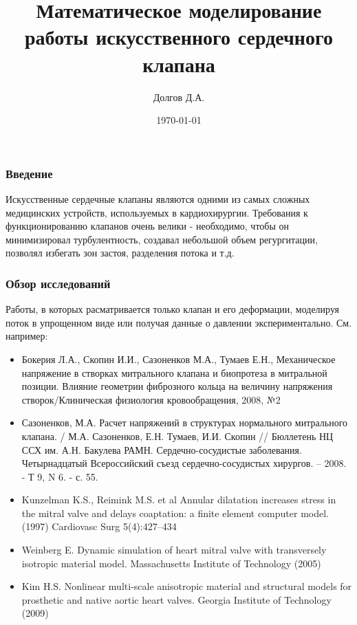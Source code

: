 \documentclass[14pt]{beamer}
\title[Моделирование клапанов]{Математическое моделирование работы искусственного сердечного клапана}
\date{\today}
\author[Долгов Д.А.]{Долгов Д.А.}
\institute{Кемеровский Государственный Университет \\
    \vspace{0.7cm}
    \vspace{0.7cm}
}
\begin{document}
\maketitle

\begin{frame}
\frametitle{Введение}
Искусственные сердечные клапаны являются одними из самых сложных медицинских
устройств, используемых в кардиохирургии. Требования к функционированию
клапанов очень велики - необходимо, чтобы он минимизировал турбулентность,
создавал небольшой объем регургитации, позволял избегать зон застоя, разделения
потока и т.д.
\end{frame}

\begin{frame}
\frametitle{Обзор исследований}
Работы, в которых расматривается только клапан и его деформации, моделируя
поток в упрощенном виде или получая данные о давлении экспериментально. См. например:\\
\par
{\tiny
    \begin{itemize}
        \item[\MVRightarrow] Бокерия Л.А., Скопин И.И., Сазоненков М.А., Тумаев Е.Н., Механическое напряжение в створках митрального клапана и биопротеза в митральной позиции. Влияние геометрии фиброзного кольца на величину напряжения створок/Клиническая физиология кровообращения, 2008, №2
        \item[\MVRightarrow] Сазоненков, М.А. Расчет напряжений в структурах нормального митрального клапана. / М.А. Сазоненков, Е.Н. Тумаев, И.И. Скопин // Бюллетень НЦ ССХ им. А.Н. Бакулева РАМН. Сердечно-сосудистые заболевания. Четырнадцатый Всероссийский съезд сердечно-сосудистых хирургов. – 2008. - Т 9, N 6. - с. 55.
        \item[\MVRightarrow] Kunzelman K.S., Reimink M.S. et al  Annular dilatation increases stress in the mitral valve and delays coaptation: a finite element computer model. (1997) Cardiovasc Surg 5(4):427–434
        \item[\MVRightarrow] Weinberg E. Dynamic simulation of heart mitral valve with transversely isotropic material model. Massachusetts Institute of Technology (2005)
        \item[\MVRightarrow] Kim H.S. Nonlinear multi-scale anisotropic material and structural models for prosthetic and native aortic heart valves. Georgia Institute of Technology (2009)
    \end{itemize}
}
\end{frame}
\end{document}
